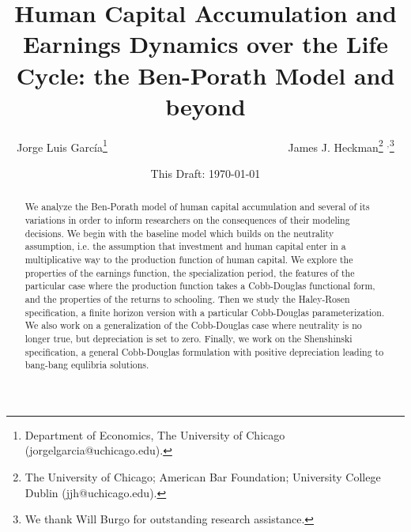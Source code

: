 


\title{Human Capital Accumulation and Earnings Dynamics over the Life Cycle: the Ben-Porath Model and beyond}
\author{Jorge Luis Garc\'{i}a\thanks{Department of Economics, The University of Chicago (jorgelgarcia@uchicago.edu).} \ \ \ \ \ \ \ \ \ \ \ \ \ \ \ \ \ \ \ \ \ \ \
 \ \ \ \ \ \ \ \ \ James J. Heckman\thanks{The University of Chicago; American Bar Foundation; University College Dublin (jjh@uchicago.edu).} $^{,}$\thanks{We thank  Will Burgo for outstanding research assistance.}}
\date{This Draft: \today}
\maketitle


\begin{abstract}
\noindent We analyze the Ben-Porath model of human capital accumulation and several of its variations in order to inform researchers on the consequences of their modeling decisions. We begin with the baseline model which builds on the neutrality assumption, i.e. the assumption that investment and human capital enter in a multiplicative way to the production function of human capital. We explore the properties of the earnings function, the specialization period, the features of the particular case where the production function takes a Cobb-Douglas functional form, and the properties of the returns to schooling. Then we study the Haley-Rosen specification, a finite horizon version with a particular Cobb-Douglas parameterization. We also work on a generalization of the Cobb-Douglas case where neutrality is no longer true, but depreciation is set to zero. Finally, we work on the Shenshinski specification, a general Cobb-Douglas formulation with positive depreciation leading to bang-bang equlibria solutions.
\end{abstract}



 



\thispagestyle{empty}
\pagestyle{empty}

\setcounter{section}{0} \renewcommand{\thesection}{Appendix \arabic{section}}
\clearpage
\setcounter{figure}{0}  \renewcommand{\thefigure}{A1.\arabic{figure}}
\setcounter{table}{0}   \renewcommand{\thetable}{A1.\arabic{table}}
\setcounter{equation}{0}







